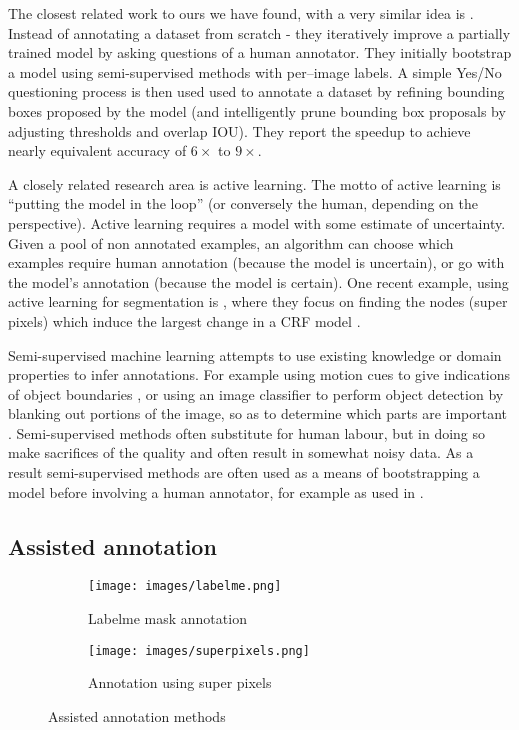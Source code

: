 \documentclass{IEEEtran}
\begin{document}
The closest related work to ours we have found, with a very similar idea is \cite{Papadopoulos2016}. Instead of annotating a dataset from scratch - they iteratively improve a partially trained model by asking questions of a human annotator. They initially bootstrap a model using semi-supervised methods with per--image labels. A simple Yes/No questioning process is then used used to annotate a dataset by refining bounding boxes proposed by the model (and intelligently prune bounding box proposals by adjusting thresholds and overlap \gls{IOU}). They report the speedup to achieve nearly equivalent accuracy of $6\times$ to $9\times$.

A closely related research area is active learning. The motto of active learning is ``putting the model in the loop'' (or conversely the human, depending on the perspective). Active learning requires a model with some estimate of uncertainty. Given a pool of non annotated examples, an algorithm can choose which examples require human annotation (because the model is uncertain), or go with the model's annotation (because the model is certain). One recent example, using active learning for segmentation is \cite{Xu2017}, where they focus on finding the nodes (super pixels) which induce the largest change in a \gls{CRF} model .

Semi-supervised machine learning attempts to use existing knowledge or domain properties to infer annotations. For example using motion cues to give indications of object boundaries \cite{Hong2017}, or using an image classifier to perform object detection by blanking out portions of the image, so as to determine which parts are important \cite{Bazzani2016}. Semi-supervised methods often substitute for human labour, but in doing so make sacrifices of the quality and often result in somewhat noisy data. As a result semi-supervised methods are often used as a means of bootstrapping a model before involving a human annotator, for example as used in \cite{Papadopoulos2016}.


\subsection {Assisted annotation}


\begin{figure}[h]
\centering
\begin{subfigure}{.25\textwidth}
  \centering
  \texttt{[image: images/labelme.png]}
  \caption{Labelme mask annotation}  
  \label{fig:labelme}
\end{subfigure}%
\begin{subfigure}{.25\textwidth}
  \centering
  \texttt{[image: images/superpixels.png]}
  \caption{Annotation using super pixels}
  \label{fig:superpixels}
\end{subfigure}

\caption{Assisted annotation methods}
\label{fig:tree}
\end{figure}
\end{document}

